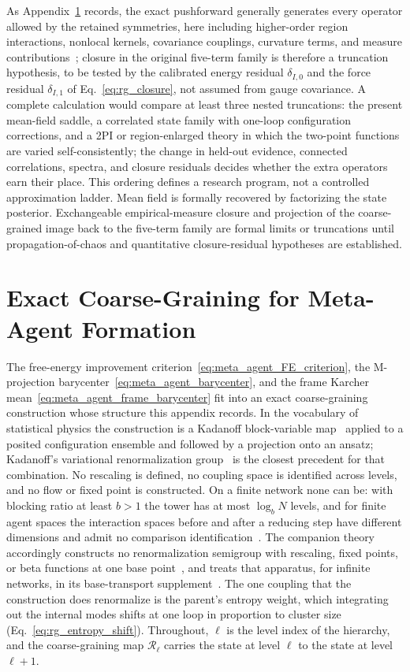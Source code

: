 \documentclass[11pt]{article}
\begin{document}
As Appendix~\ref{sec:meta_agent_rg} records, the exact pushforward generally generates every operator allowed by the retained symmetries, here including higher-order region interactions, nonlocal kernels, covariance couplings, curvature terms, and measure contributions~\cite{Wilson1974}; closure in the original five-term family is therefore a truncation hypothesis, to be tested by the calibrated energy residual $\delta_{I,0}$ and the force residual $\delta_{I,1}$ of Eq.~\eqref{eq:rg_closure}, not assumed from gauge covariance. A complete calculation would compare at least three nested truncations: the present mean-field saddle, a correlated state family with one-loop configuration corrections, and a 2PI or region-enlarged theory in which the two-point functions are varied self-consistently; the change in held-out evidence, connected correlations, spectra, and closure residuals decides whether the extra operators earn their place. This ordering defines a research program, not a controlled approximation ladder. Mean field is formally recovered by factorizing the state posterior. Exchangeable empirical-measure closure and projection of the coarse-grained image back to the five-term family are formal limits or truncations until propagation-of-chaos and quantitative closure-residual hypotheses are established.
\section{Exact Coarse-Graining for Meta-Agent Formation}
\label{sec:meta_agent_rg}

The free-energy improvement criterion~\eqref{eq:meta_agent_FE_criterion}, the M-projection barycenter~\eqref{eq:meta_agent_barycenter}, and the frame Karcher mean~\eqref{eq:meta_agent_frame_barycenter} fit into an exact coarse-graining construction whose structure this appendix records. In the vocabulary of statistical physics the construction is a Kadanoff block-variable map~\cite{kadanoff1966scaling} applied to a posited configuration ensemble and followed by a projection onto an ansatz; Kadanoff's variational renormalization group~\cite{Kadanoff1975, KadanoffHoughtonYalabik1976} is the closest precedent for that combination. No rescaling is defined, no coupling space is identified across levels, and no flow or fixed point is constructed. On a finite network none can be: with blocking ratio at least $b>1$ the tower has at most $\log_b N$ levels, and for finite agent spaces the interaction spaces before and after a reducing step have different dimensions and admit no comparison identification~\cite[Ch.~11]{DennisGaugeVFE2026}. The companion theory accordingly constructs no renormalization semigroup with rescaling, fixed points, or beta functions at one base point~\cite[Ch.~1]{DennisGaugeVFE2026}, and treats that apparatus, for infinite networks, in its base-transport supplement~\cite[Chs.~B5 and B6]{DennisGaugeVFESuppB2026}. The one coupling that the construction does renormalize is the parent's entropy weight, which integrating out the internal modes shifts at one loop in proportion to cluster size (Eq.~\eqref{eq:rg_entropy_shift}). Throughout, $\ell$ is the level index of the hierarchy, and the coarse-graining map $\mathcal{R}_\ell$ carries the state at level $\ell$ to the state at level $\ell+1$.
\end{document}
